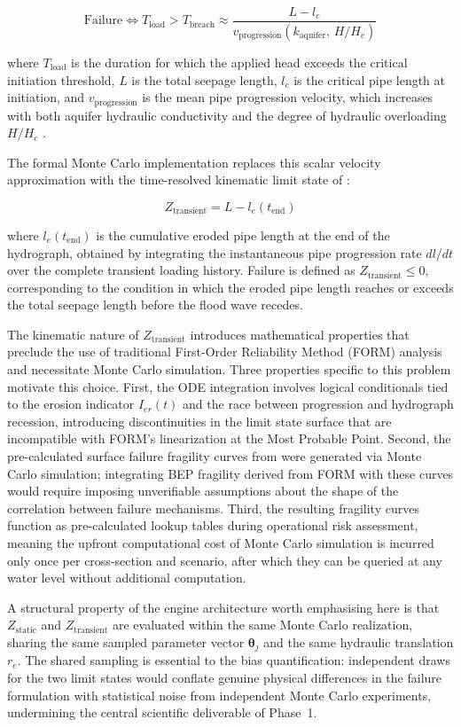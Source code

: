 $$\mathrm{Failure} \iff T_\mathrm{load} > T_\mathrm{breach} \approx \frac{L - l_c}{v_\mathrm{progression}(k_\mathrm{aquifer},\, H/H_c)}$$

where $T_\mathrm{load}$ is the duration for which the applied head exceeds the critical initiation threshold, $L$ is the total seepage length, $l_c$ is the critical pipe length at initiation, and $v_\mathrm{progression}$ is the mean pipe progression velocity, which increases with both aquifer hydraulic conductivity and the degree of hydraulic overloading $H/H_c$ \parencite{van_beek_2015, vandenboer_2019}.

The formal Monte Carlo implementation replaces this scalar velocity approximation with the time-resolved kinematic limit state of \textcite{pol_compgeo_2024}:

$$Z_\mathrm{transient} = L - l_e(t_\mathrm{end})$$

where $l_e(t_\mathrm{end})$ is the cumulative eroded pipe length at the end of the hydrograph, obtained by integrating the instantaneous pipe progression rate $dl/dt$ over the complete transient loading history. Failure is defined as $Z_\mathrm{transient} \leq 0$, corresponding to the condition in which the eroded pipe length reaches or exceeds the total seepage length before the flood wave recedes.

The kinematic nature of $Z_\mathrm{transient}$ introduces mathematical properties that preclude the use of traditional First-Order Reliability Method (FORM) analysis and necessitate Monte Carlo simulation. Three properties specific to this problem motivate this choice. First, the ODE integration involves logical conditionals tied to the erosion indicator $I_{er}(t)$ and the race between progression and hydrograph recession, introducing discontinuities in the limit state surface that are incompatible with FORM's linearization at the Most Probable Point. Second, the pre-calculated surface failure fragility curves from \textcite{uemura_phd_2025} were generated via Monte Carlo simulation; integrating BEP fragility derived from FORM with these curves would require imposing unverifiable assumptions about the shape of the correlation between failure mechanisms. Third, the resulting fragility curves function as pre-calculated lookup tables during operational risk assessment, meaning the upfront computational cost of Monte Carlo simulation is incurred only once per cross-section and scenario, after which they can be queried at any water level without additional computation.

A structural property of the engine architecture worth emphasising here is that $Z_\mathrm{static}$ and $Z_\mathrm{transient}$ are evaluated within the same Monte Carlo realization, sharing the same sampled parameter vector $\boldsymbol{\theta}_j$ and the same hydraulic translation $r_e$. The shared sampling is essential to the bias quantification: independent draws for the two limit states would conflate genuine physical differences in the failure formulation with statistical noise from independent Monte Carlo experiments, undermining the central scientific deliverable of Phase~1.

